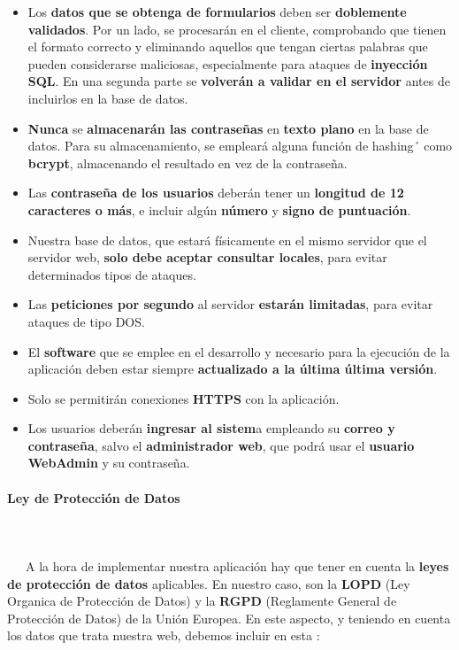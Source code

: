 \begin{itemize}
	\item Los \textbf{datos que se obtenga de formularios} deben ser \textbf{doblemente validados}. Por un lado, se procesarán en el cliente, comprobando que tienen el formato correcto y eliminando aquellos que tengan ciertas palabras que pueden considerarse maliciosas, especialmente para ataques de \textbf{inyección SQL}. En una segunda parte se \textbf{volverán a validar en el servidor} antes de incluirlos en la base de datos.
	
	\item \textbf{Nunca} se \textbf{almacenarán las contraseñas} en \textbf{texto plano} en la base de datos. Para su almacenamiento, se empleará alguna función de \gls{hashing}´ como \textbf{bcrypt}, almacenando el resultado en vez de la contraseña.
	
	\item Las \textbf{contraseña de los usuarios} deberán tener un \textbf{longitud de 12 caracteres o más}, e incluir algún \textbf{número} y \textbf{signo de puntuación}.
	
	\item Nuestra base de datos, que estará físicamente en el mismo servidor que el servidor web, \textbf{solo debe aceptar consultar locales}, para evitar determinados tipos de ataques. 
	
	\item Las \textbf{peticiones por segundo} al servidor \textbf{estarán limitadas}, para evitar ataques de tipo \gls{DOS}.
	
	\item El \textbf{software} que se emplee en el desarrollo y necesario para la ejecución de la aplicación deben estar siempre \textbf{actualizado a la última última versión}.
	
	\item Solo se permitirán conexiones \textbf{HTTPS} con la aplicación.
	
	\item Los usuarios deberán \textbf{ingresar al sistem}a empleando su \textbf{correo y contraseña}, salvo el \textbf{administrador web}, que podrá usar el \textbf{usuario WebAdmin} y su contraseña.
\end{itemize}

\paragraph{Ley de Protección de Datos}
~\\\\
\-\ \-\ \-\ A la hora de implementar nuestra aplicación hay que tener en cuenta la \textbf{leyes de protección de datos} aplicables. En nuestro caso, son la \textbf{LOPD} (Ley Organica de Protección de Datos) y la \textbf{RGPD} (Reglamente General de Protección de Datos) de la Unión Europea. En este aspecto, y teniendo en cuenta los datos que trata nuestra web, debemos incluir en esta \cite{lopd}:

